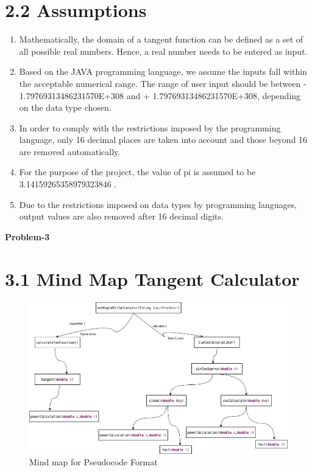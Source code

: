 \documentclass[12pt]{article}
\begin{document}
\section*{2.2 Assumptions}
    \begin{enumerate}
        \item Mathematically, the domain of a tangent function can be defined as a set of all possible real numbers. Hence, a real number needs to be entered as input.
        \item Based on the JAVA programming language, we assume the inputs fall within the acceptable numerical range. The range of user input should be between - 1.79769313486231570E+308 and + 1.79769313486231570E+308, depending on the data type chosen.
        \item In order to comply with the restrictions imposed by the programming language, only 16 decimal places are taken into account and those beyond 16 are removed automatically.
        \item For the purpose of the project, the value of pi is assumed to be 3.14159265358979323846 \textbf{\cite{wiki_pi}}.
        \item Due to the restrictions imposed on data types by programming languages, output values are also removed after 16 decimal digits.
    \end{enumerate}

\newpage
\noindent
\Large\textbf{Problem-3}
\section*{3.1 Mind Map Tangent Calculator}
\begin{figure}[h!]
\centering
\centering
    \includegraphics[scale=0.5]{mindmap.png}
    \caption{Mind map for Pseudocode Format}
\end{figure}
\end{document}
